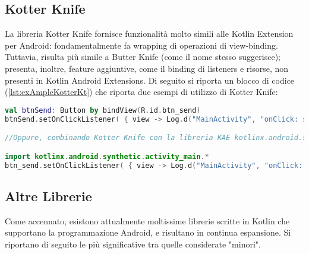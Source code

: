 \subsection{Kotter Knife}
La libreria Kotter Knife fornisce funzionalità molto simili alle Kotlin Extension per Android: fondamentalmente fa wrapping di operazioni di view-binding. Tuttavia, risulta più simile a Butter Knife (come il nome stesso suggerisce); presenta, inoltre, feature aggiuntive, come il binding di listeners e risorse, non presenti in Kotlin Android Extensions. Di seguito si riporta un blocco di codice (\ref{lst:exAmpleKotterKt}) che riporta due esempi di utilizzo di Kotter Knife:\\

\begin{lstlisting}[caption={Due esempi di uso di Kotter Knife con Kotlin}, captionpos=b, label={lst:exAmpleKotterKt}, language=Kotlin]
val btnSend: Button by bindView(R.id.btn_send)
btnSend.setOnClickListener( { view -> Log.d("MainActivity", "onClick: send") } )

//Oppure, combinando Kotter Knife con la libreria KAE kotlinx.android.synthetic

import kotlinx.android.synthetic.activity_main.*
btn_send.setOnClickListener( { view -> Log.d("MainActivity", "onClick: send") } )
\end{lstlisting}

\subsection{Altre Librerie}
Come accennato, esistono attualmente moltissime librerie scritte in Kotlin che supportano la programmazione Android, e risultano in continua espansione. Si riportano di seguito le più significative tra quelle considerate "minori".\\

